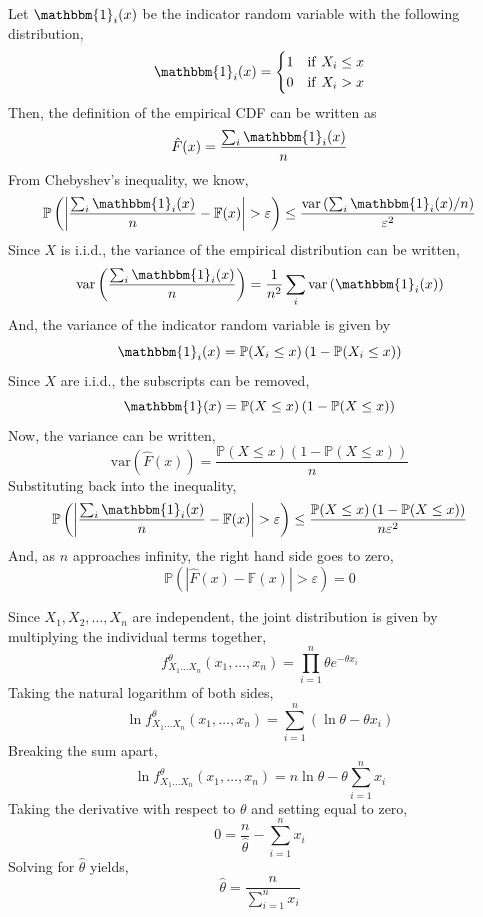 \documentclass[12pt,twoside]{article}
\begin{document}
\begin{problems}
\begin{problemparts}
Let $\mathbbm{1}_i(x)$ be the indicator random variable with the following
distribution,
$$ \mathbbm{1}_i(x) = \begin{cases}
    1 & \mathrm{if}\ X_i \leq x \\
    0 & \mathrm{if}\ X_i > x
\end{cases} $$
Then, the definition of the empirical CDF can be written as
$$ \hat{F}(x) = \frac{\sum_i \mathbbm{1}_i(x)}{n} $$
From Chebyshev's inequality, we know,
$$ \mathbb{P}\left(\left\vert \frac{\sum_i \mathbbm{1}_i(x)}{n} - \mathbb{F}(x)
\right\vert > \varepsilon\right) \leq \frac{\mathrm{var}\left(\sum_i 
\mathbbm{1}_i(x) / n\right)}{\varepsilon^2} $$
Since $X$ is i.i.d., the variance of the empirical distribution can be written,
$$ \mathrm{var}\left(\frac{\sum_i \mathbbm{1}_i(x)}{n}\right) = \frac{1}{n^2} 
\sum_i \mathrm{var} \left(\mathbbm{1}_i(x)\right) $$
And, the variance of the indicator random variable is given by
$$ \mathbbm{1}_i(x) = \mathbb{P}(X_i \leq x)\left(1 - \mathbb{P}(X_i \leq x)
\right) $$
Since $X$ are i.i.d., the subscripts can be removed,
$$ \mathbbm{1}(x) = \mathbb{P}(X \leq x)\left(1 - \mathbb{P}(X \leq x)
\right) $$
Now, the variance can be written,
$$\mathrm{var}(\hat{F}(x)) = \frac{\mathbb{P}(X \leq x)\left(1 - \mathbb{P}
(X \leq x) \right)}{n} $$
Substituting back into the inequality,
$$ \mathbb{P}\left(\left\vert \frac{\sum_i \mathbbm{1}_i(x)}{n} - \mathbb{F}(x)
\right\vert > \varepsilon\right) \leq \frac{\mathbb{P}(X \leq x)\left(1 - 
\mathbb{P}(X \leq x) \right)}{n \varepsilon^2} $$
And, as $n$ approaches infinity, the right hand side goes to zero,
$$ \mathbb{P}\left(\left\vert \hat{F}(x) - \mathbb{F}(x) \right\vert > 
\varepsilon\right) = 0$$




\end{problemparts}

\newpage
\problem  %

\begin{problemparts}

\problempart %
Since $X_1, X_2, \ldots, X_n$ are independent, the joint distribution is given
by multiplying the individual terms together,
$$ f_{X_1\ldots X_n}^\theta(x_1, \ldots, x_n) = \prod_{i = 1}^n \theta e^{-
\theta x_i} $$
Taking the natural logarithm of both sides,
$$ \ln f_{X_1\ldots X_n}^\theta(x_1, \ldots, x_n) = \sum_{i = 1}^n \left(\ln 
\theta - \theta x_i\right) $$
Breaking the sum apart,
$$ \ln f_{X_1\ldots X_n}^\theta(x_1, \ldots, x_n) = n \ln \theta - \theta 
\sum_{i = 1}^n x_i $$
Taking the derivative with respect to $\theta$ and setting equal to zero,
$$ 0 = \frac{n}{\hat{\theta}} - \sum_{i = 1}^n x_i $$
Solving for $\hat{\theta}$ yields,
$$ \hat{\theta} = \frac{n}{\sum_{i = 1}^n x_i} $$


\end{problemparts}
\end{problems}
\end{document}
